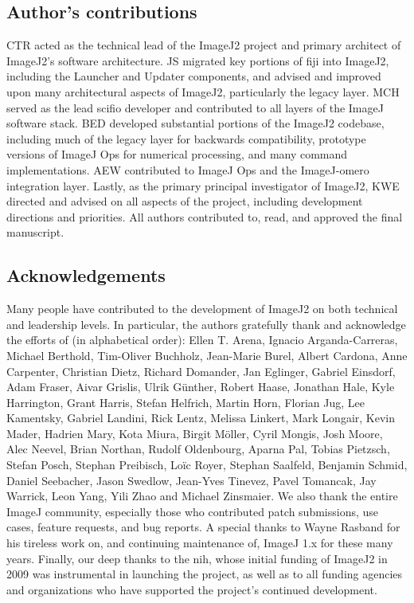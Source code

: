 \documentclass{bmcart}
\begin{document}
\begin{backmatter}
\subsection*{Author's contributions}
  CTR acted as the technical lead of the ImageJ2 project and primary architect
  of ImageJ2's software architecture. JS migrated key portions of
  \acrshort{fiji} into ImageJ2, including the Launcher and Updater components,
  and advised and improved upon many architectural aspects of ImageJ2,
  particularly the legacy layer. MCH served as the lead \acrshort{scifio}
  developer and contributed to all layers of the ImageJ software stack. BED
  developed substantial portions of the ImageJ2 codebase, including much of the
  legacy layer for backwards compatibility, prototype versions of ImageJ Ops
  for numerical processing, and many command implementations. AEW contributed
  to ImageJ Ops and the ImageJ-\acrshort{omero} integration layer. Lastly, as
  the primary principal investigator of ImageJ2, KWE directed and advised on
  all aspects of the project, including development directions and priorities.
  All authors contributed to, read, and approved the final manuscript.

\subsection*{Acknowledgements}
  Many people have contributed to the development of ImageJ2 on both technical
  and leadership levels. In particular, the authors gratefully thank and
  acknowledge the efforts of (in alphabetical order): Ellen T. Arena, Ignacio
  Arganda-Carreras, Michael Berthold, Tim-Oliver Buchholz, Jean-Marie Burel,
  Albert Cardona, Anne Carpenter, Christian Dietz, Richard Domander, Jan
  Eglinger, Gabriel Einsdorf, Adam Fraser, Aivar Grislis, Ulrik Günther, Robert
  Haase, Jonathan Hale, Kyle Harrington, Grant Harris, Stefan Helfrich, Martin
  Horn, Florian Jug, Lee Kamentsky, Gabriel Landini, Rick Lentz, Melissa
  Linkert, Mark Longair, Kevin Mader, Hadrien Mary, Kota Miura, Birgit Möller,
  Cyril Mongis, Josh Moore, Alec Neevel, Brian Northan, Rudolf Oldenbourg,
  Aparna Pal, Tobias Pietzsch, Stefan Posch, Stephan Preibisch, Loïc Royer,
  Stephan Saalfeld, Benjamin Schmid, Daniel Seebacher, Jason Swedlow, Jean-Yves
  Tinevez, Pavel Tomancak, Jay Warrick, Leon Yang, Yili Zhao and Michael
  Zinsmaier. We also thank the entire ImageJ community, especially those who
  contributed patch submissions, use cases, feature requests, and bug reports.
  A special thanks to Wayne Rasband for his tireless work on, and continuing
  maintenance of, ImageJ 1.x for these many years. Finally, our deep thanks to
  the \acrshort{nih}, whose initial funding of ImageJ2 in 2009 was instrumental
  in launching the project, as well as to all funding agencies and
  organizations who have supported the project's continued development.
  \cite{imagej_funding}


\end{backmatter}
\end{document}

